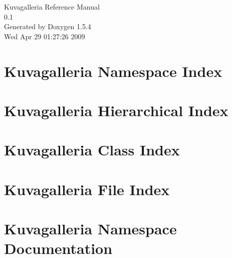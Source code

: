 \documentclass[a4paper]{book}
\begin{document}
\begin{titlepage}
\vspace*{7cm}
\begin{center}
{\Large Kuvagalleria Reference Manual\\[1ex]\large 0.1 }\\
\vspace*{1cm}
{\large Generated by Doxygen 1.5.4}\\
\vspace*{0.5cm}
{\small Wed Apr 29 01:27:26 2009}\\
\end{center}
\end{titlepage}
\clearemptydoublepage
{}
\tableofcontents
\clearemptydoublepage
{}
\chapter{Kuvagalleria Namespace Index}

\chapter{Kuvagalleria Hierarchical Index}

\chapter{Kuvagalleria Class Index}

\chapter{Kuvagalleria File Index}

\chapter{Kuvagalleria Namespace Documentation}



\end{document}
